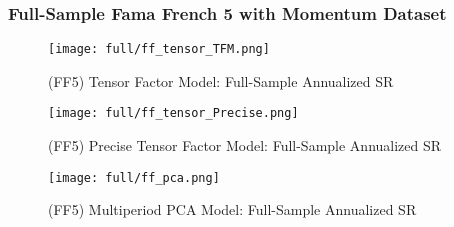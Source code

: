 \subsubsection{Full-Sample Fama French 5 with Momentum Dataset}

\begin{figure}[H]
    \centering
    \texttt{[image: full/ff\_tensor\_TFM.png]}
    \caption{(FF5) Tensor Factor Model: Full-Sample Annualized SR}
    \label{fig:ff-primary-tfm}
\end{figure}

\begin{figure}[H]
    \centering
    \texttt{[image: full/ff\_tensor\_Precise.png]}
    \caption{(FF5) Precise Tensor Factor Model: Full-Sample Annualized SR}
    \label{fig:ff-primary-precise}
\end{figure}


\begin{figure}[H]
    \centering
    \texttt{[image: full/ff\_pca.png]}
    \caption{(FF5) Multiperiod PCA Model: Full-Sample Annualized SR}
    \label{fig:ff-primary-pca}
\end{figure}
